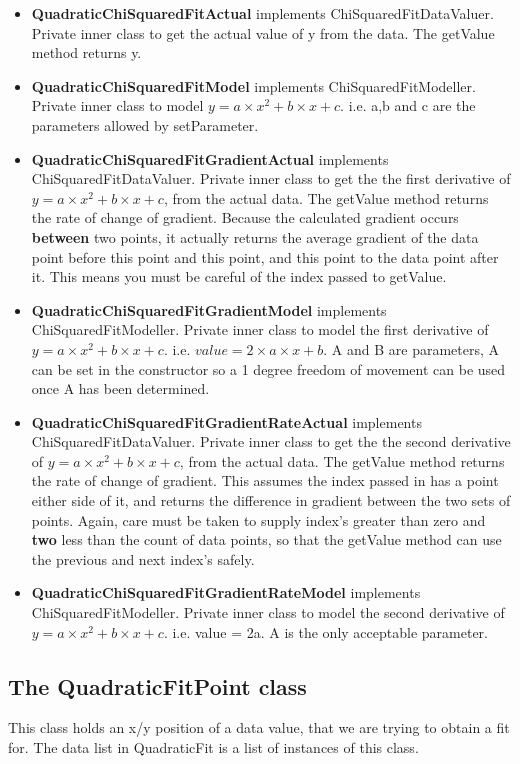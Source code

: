 \documentclass[10pt,a4paper]{article}
\begin{document}
\begin{itemize}
\item {\bf QuadraticChiSquaredFitActual} implements ChiSquaredFitDataValuer. 
	Private inner class to get the actual value of y from the data. The getValue method returns y.
\item {\bf QuadraticChiSquaredFitModel} implements ChiSquaredFitModeller. 
	Private inner class to model $y = a \times x^2 + b \times x + c$. 
	i.e. a,b and c are the parameters allowed by setParameter. 
\item {\bf QuadraticChiSquaredFitGradientActual} implements ChiSquaredFitDataValuer. 
	Private inner class to get the the first derivative of 
	$y = a \times x^2 + b \times x + c$, from the actual data. 
	The getValue method returns the rate of change of gradient. Because the calculated gradient occurs
	{\bf between} two points, it actually returns the average gradient of the data point before this
	point and this point, and this point to the data point after it. This means you must be careful of the
	index passed to getValue.
\item {\bf QuadraticChiSquaredFitGradientModel} implements ChiSquaredFitModeller. 
	Private inner class to model the first derivative of 
	$y= a \times x^2 + b \times x + c$.
	i.e. $value = 2 \times a \times x + b$. A and B are parameters, 
	A can be set in the constructor so a 1 degree freedom of movement can be used once A has been determined. 
\item {\bf QuadraticChiSquaredFitGradientRateActual} implements ChiSquaredFitDataValuer. 
	Private inner class to get the the second derivative of 
	$y = a \times x^2 + b \times x + c$, from the actual data. 
	The getValue method returns the rate of change of gradient. This assumes the index passed in has a point either
	side of it, and returns the difference in gradient between the two sets of points. Again, care must be
	taken to supply index's greater than zero and {\bf two} less than the count of data points, so that
	the getValue method can use the previous and next index's safely.
\item {\bf QuadraticChiSquaredFitGradientRateModel} implements ChiSquaredFitModeller. 
	Private inner class to model the second derivative of 
	$y= a \times x^2 + b \times x + c$. i.e. value = 2a. A is the only acceptable parameter.
\end{itemize}

\subsection{The QuadraticFitPoint class}
This class holds an x/y position of a data value, that we are trying to obtain a fit for. The data list in
QuadraticFit is a list of instances of this class.
\end{document}
